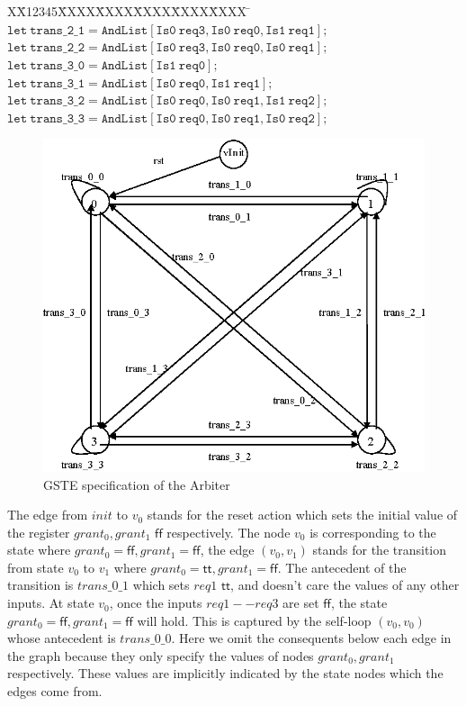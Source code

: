 \documentclass[final]{IEEEtran}
\newlength{\fminilength}
\newenvironment{fmini}[1][\linewidth]
  {\setlength{\fminilength}{#1\fboxsep-2\fboxrule}%
   \vspace{2ex}\noindent\begin{lrbox}{\fminibox}\begin{minipage}{\fminilength}%
   \mbox{ }\hfill\vspace{-2.5ex}}%
  {\end{minipage}\end{lrbox}\vspace{1ex}\hspace{0ex}%
   \framebox{\usebox{\fminibox}}}
\newenvironment{specification}
{\noindent\footnotesize\tt\begin{fmini}\begin{tabbing}X\=X12345\=XXXX\=XXXX\=XXXX\=XXXX\=XXXX
\=\+\kill} {\end{tabbing}\normalfont\end{fmini}}
\begin{document}
\begin{center}
\begin{table}
\begin{specification}
$\mathtt{let\ trans\_2\_1 = AndList [Is0 \ req3 , Is0 \ req0 , Is1 \
req1  ];}$\\

$\mathtt{let\ trans\_2\_2 = AndList [Is0 \ req3 , Is0 \ req0 , Is0 \
req1  ];}$\\

$\mathtt{let\ trans\_3\_0 = AndList [Is1 \
req0  ];}$\\

$\mathtt{let\ trans\_3\_1 = AndList [Is0 \ req0 , Is1 \
req1  ];}$\\

$\mathtt{let\ trans\_3\_2 = AndList [Is0 \ req0 , Is0 \ req1 , Is1 \
req2  ];}$\\

$\mathtt{let\ trans\_3\_3 = AndList [Is0 \ req0 , Is0 \ req1 , Is0 \
req2  ];}$\\
 \end{specification}
 \end{table}
 \end{center}

\begin{figure}[tbph]
\begin{center}
\includegraphics[width=.5\textwidth]{ArbiterGraph.eps}
\end{center}
\caption{GSTE specification of the Arbiter} \label{fig:arbiterGraph}
\end{figure}

The edge from $init$ to $v_0$ stands for the reset action which sets
the initial value of the register $grant_0, grant_1$ $\mathsf{ff}$
respectively. The node $v_0$ is corresponding to the   state where
$grant_0=\mathsf{ff}, grant_1=\mathsf{ff}$, the edge $(v_0, v_1)$
stands for the transition from state $v_0$ to $v_1$ where
$grant_0=\mathsf{tt}, grant_1=\mathsf{ff}$. The antecedent of the
transition is $trans\_0\_1$ which sets  $req1$ $\mathsf{tt}$,    and
doesn't care the values of any other inputs. At state $v_0$, once
the inputs $req1--req3$ are set $\mathsf{ff}$, the state
$grant_0=\mathsf{ff}, grant_1=\mathsf{ff}$ will hold. This is captured
by the self-loop $(v_0,v_0)$ whose antecedent is $trans\_0\_0$. Here
we omit the consequents below each edge in the graph because they
only specify the  values of nodes $grant_0,grant_1$ respectively.
These values are implicitly indicated by the   state nodes which the
edges come from.
\end{document}
